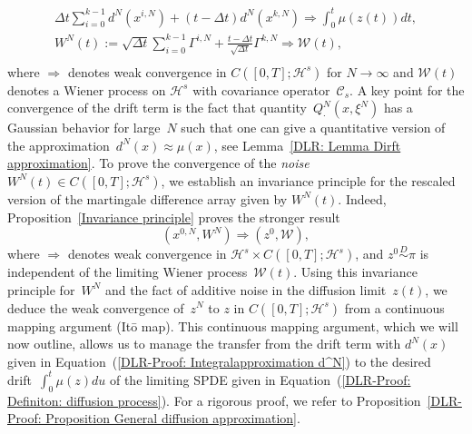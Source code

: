 \begin{equation}
  \label{DLR-Proof: Definition W^N}
  \begin{split}
   \Delta t \sum_{i=0}^{k-1} d^N(x^{i,N}) + (t - \Delta t) d^N(x^{k,N}) \Longrightarrow \int_0^t \mu(z(t)) dt, \\
   W^N(t) := \sqrt{ \Delta t} \sum_{i=0}^{k-1} \Gamma^{i,N} +  \frac{t - \Delta t}{\sqrt{\Delta t}} \Gamma^{k,N} \Longrightarrow \mathcal{W}(t), \\
 \end{split}
\end{equation}
where $\Longrightarrow$ denotes weak convergence in $C([0,T];\mathcal{H}^s)$ for $N \to \infty$ and $\mathcal{W}(t)$ denotes a Wiener process on $\mathcal{H}^s$ with  covariance operator~$\mathcal{C}_s$. A key point for the convergence of the drift term is the fact that quantity~$Q^N_{\cdot}(x, \xi^N)$ has a Gaussian behavior for large~$N$ such that one can give a quantitative version of the approximation~$ d^N(x) \approx \mu(x) $, see Lemma~\ref{DLR: Lemma Dirft approximation}. To prove the convergence of the \textit{noise}~$W^N(t) \in C([0,T];\mathcal{H}^s)$, we establish an invariance principle for the rescaled version of the martingale difference array given by $W^N(t)$. Indeed, Proposition~\ref{Invariance principle} proves the stronger result
\begin{equation*}
  (x^{0,N}, W^N) \Longrightarrow (z^0, \mathcal{W}),
\end{equation*}
where $\Longrightarrow$ denotes weak convergence in $\mathcal{H}^s \times C([0,T];\mathcal{H}^s)$, and $z^0 \stackrel{D}{\sim} \pi$ is independent of the limiting Wiener process~$\mathcal{W}(t)$. Using this invariance principle for~$W^N$ and the fact of additive noise in the diffusion limit~$z(t)$, we deduce the weak convergence of~$z^N$ to $z$ in $ C([0,T];\mathcal{H}^s)$ from a continuous  mapping argument (It\={o} map). This continuous mapping argument, which we will now outline, allows us to manage the transfer from the drift term with $d^N(x)$ given in Equation~(\ref{DLR-Proof: Integralapproximation d^N}) to the desired drift~$ \int_0^t \mu(z) du$ of the limiting SPDE given in Equation~(\ref{DLR-Proof: Definiton: diffusion process}). For a rigorous proof, we refer to Proposition~\ref{DLR-Proof: Proposition General diffusion approximation}.

